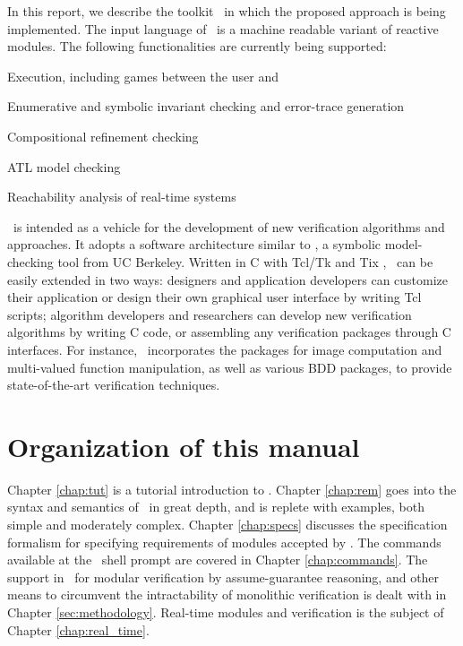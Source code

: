 


\noindent
In this report, we describe the toolkit \mocha\ in which the
proposed approach is being implemented.  The input language of \mocha\
is a machine readable variant of reactive modules.
The following functionalities are currently being supported:

\begin{itemize}
\vitem
Execution, including games between the user and \mocha\

\vitem
Enumerative and symbolic invariant checking and error-trace generation

\vitem
Compositional refinement checking

\vitem
ATL model checking 

\vitem
Reachability analysis of real-time systems
\end{itemize}

\noindent
\mocha\ is intended as a vehicle for the development of new
verification algorithms and approaches.  It adopts a software
architecture similar to \vis \cite{BHS96}, a symbolic model-checking
tool from UC Berkeley.  Written in C with Tcl/Tk and Tix
\cite{tix-http}, \mocha\ can be easily extended in two ways: designers
and application developers can customize their application or design
their own graphical user interface by writing Tcl scripts; algorithm
developers and researchers can develop new verification algorithms by
writing C code, or assembling any verification packages through C
interfaces.  For instance, \mocha\ incorporates the \vis packages
for image computation and multi-valued function manipulation, as well
as various BDD packages, to provide state-of-the-art verification
techniques.



\section{Organization of this manual}
Chapter \ref{chap:tut} is a tutorial introduction to \mocha. Chapter
\ref{chap:rem} goes into the syntax and semantics of \rem\ in great
depth, and is replete with examples, both simple and moderately
complex.  Chapter
\ref{chap:specs} discusses the specification
formalism for specifying requirements of modules accepted by
\mocha. The commands available at the \mocha\ shell prompt are covered
in Chapter \ref{chap:commands}. The support in \mocha\ for modular
verification by assume-guarantee reasoning, and other means to
circumvent the intractability of monolithic verification is dealt with
in Chapter \ref{sec:methodology}. Real-time modules and verification
is the subject of Chapter \ref{chap:real_time}. 


